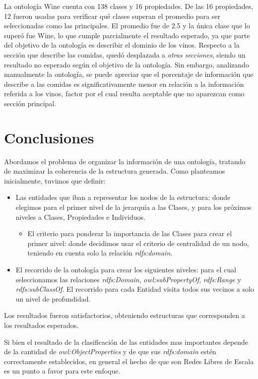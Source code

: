 La ontología Wine cuenta con 138 clases y 16 propiedades. De las 16 propiedades, 12 fueron usadas para verificar qué clases superan el promedio para ser seleccionadas como las principales. El promedio fue de 2.5 y la única clase que lo superó fue Wine, lo que cumple parcialmente el resultado esperado, ya que parte del objetivo de la ontología es describir el dominio de los vinos. Respecto a la sección que describe las comidas, quedó desplazada a \emph{otras secciones}, siendo un resultado no esperado según el objetivo de la ontología. Sin embargo, analizando manualmente la ontología, se puede apreciar que el porcentaje de  información que describe a las comidas es significativamente menor en relación a la información referida a los vinos, factor por el cual resulta aceptable que no aparezcan como sección principal.


\section{Conclusiones}
Abordamos el problema de organizar la información de una ontología, tratando de maximizar la coherencia de la estructura generada. Como planteamos inicialmente, tuvimos que definir:
\begin{itemize}
    \item Las entidades que iban a representar los nodos de la estructura: donde elegimos para el primer nivel de la jerarquía a las Clases, y para los próximos niveles a Clases, Propiedades e Individuos.
    \begin{itemize}
        \item El criterio para ponderar la importancia de las Clases para crear el primer nivel: donde decidimos usar el criterio de centralidad de un nodo, teniendo en cuenta solo la relación \emph{rdfs:domain}.
    \end{itemize}
    \item El recorrido de la ontología para crear los siguientes niveles: para el cual seleccionamos las relaciones \emph{rdfs:Domain}, \emph{owl:subPropertyOf}, \emph{rdfs:Range} y \emph{rdfs:subClassOf}. El recorrido para cada Entidad visita todos sus vecinos a solo un nivel de profundidad.
\end{itemize}

Los resultados fueron satisfactorios, obteniendo estructuras que corresponden a los resultados esperados. 

Si bien el resultado de la clasificación de las entidades mas importantes depende de la cantidad de \emph{owl:ObjectProperties} y de que sus \emph{rdfs:domain} estén correctamente establecidos, en general el hecho de que son Redes Libres de Escala es un punto a favor para este enfoque.